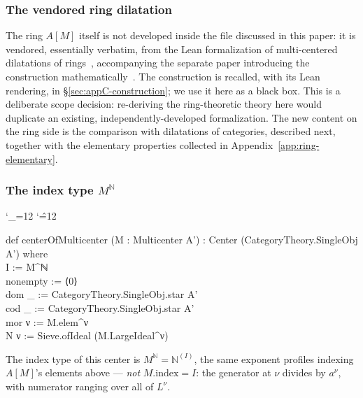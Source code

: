 \documentclass[11pt]{amsart}
\newenvironment{leancode}{%
  \begingroup
  \catcode`\_=12\relax
  \catcode`\^=12\relax
  \small\ttfamily\raggedright\baselineskip=1.15\baselineskip
  \par\smallskip\noindent
}{%
  \par\smallskip
  \endgroup
}
\theoremstyle{plain}
\theoremstyle{definition}
\theoremstyle{remark}
\begin{document}
\subsubsection*{The vendored ring dilatation}
The ring $A[M]$ itself is not developed inside the file discussed in this paper: it is
vendored, essentially verbatim, from the Lean formalization of multi-centered dilatations of
rings~\citep{MZ}, accompanying the separate paper introducing the construction
mathematically~\citep{M}. The construction is recalled, with its Lean rendering, in
\S\ref{sec:appC-construction}; we use it here as a black box. This is a deliberate scope
decision: re-deriving the ring-theoretic theory here would duplicate an existing,
independently-developed formalization. The new content on the ring side is the comparison
with dilatations of categories, described next, together with the elementary properties
collected in Appendix~\ref{app:ring-elementary}.

\subsubsection*{The index type $M^{\mathbb N}$}
\begin{leancode}
def centerOfMulticenter (M : Multicenter A') : Center (CategoryTheory.SingleObj A') where \\
  I := M^ℕ \\
  nonempty := ⟨0⟩ \\
  dom _ := CategoryTheory.SingleObj.star A' \\
  cod _ := CategoryTheory.SingleObj.star A' \\
  mor ν := M.elem^ν \\
  N ν := Sieve.ofIdeal (M.LargeIdeal^ν) \\
\end{leancode}
The index type of this center is $M^{\mathbb N} = \mathbb N^{(I)}$, the same exponent
profiles indexing $A[M]$'s elements above --- \emph{not} $M.\mathrm{index} = I$: the generator at
$\nu$ divides by $a^\nu$, with numerator ranging over all of $L^\nu$.
\end{document}
